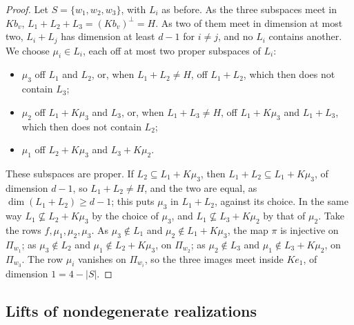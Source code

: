 \begin{proof}
  Let $S = \{w_1, w_2, w_3\}$, with $L_i$ as before. As the three
  subspaces meet in $K b_v$, $L_1 + L_2 + L_3 = (K b_v)^{\perp} = H$. As
  two of them meet in dimension at most two, $L_i + L_j$ has dimension at
  least $d - 1$ for $i \ne j$, and no $L_i$ contains another. We choose
  $\mu_i \in L_i$, each off at most two proper subspaces of $L_i$:
  \begin{itemize}
    \item $\mu_3$ off $L_1$ and $L_2$, or, when $L_1 + L_2 \ne H$, off
      $L_1 + L_2$, which then does not contain $L_3$;
    \item $\mu_2$ off $L_1 + K\mu_3$ and $L_3$, or, when
      $L_1 + L_3 \ne H$, off $L_1 + K\mu_3$ and $L_1 + L_3$, which then
      does not contain $L_2$;
    \item $\mu_1$ off $L_2 + K\mu_3$ and $L_3 + K\mu_2$.
  \end{itemize}
  These subspaces are proper. If $L_2 \subseteq L_1 + K\mu_3$, then
  $L_1 + L_2 \subseteq L_1 + K\mu_3$, of dimension $d - 1$, so
  $L_1 + L_2 \ne H$, and the two are equal, as
  $\dim(L_1 + L_2) \ge d - 1$; this puts $\mu_3$ in $L_1 + L_2$, against
  its choice. In the same way $L_1 \not\subseteq L_2 + K\mu_3$ by the
  choice of $\mu_3$, and $L_1 \not\subseteq L_3 + K\mu_2$ by that of
  $\mu_2$. Take the rows $f, \mu_1, \mu_2, \mu_3$. As $\mu_3 \notin L_1$
  and $\mu_2 \notin L_1 + K\mu_3$, the map $\pi$ is injective on
  $\Pi_{w_1}$; as $\mu_3 \notin L_2$ and $\mu_1 \notin L_2 + K\mu_3$, on
  $\Pi_{w_2}$; as $\mu_2 \notin L_3$ and $\mu_1 \notin L_3 + K\mu_2$, on
  $\Pi_{w_3}$. The row $\mu_i$ vanishes on $\Pi_{w_i}$, so the three
  images meet inside $K e_1$, of dimension $1 = 4 - |S|$.
\end{proof}

\subsection{Lifts of nondegenerate realizations}
\label{sec:pencil-d-lift}

